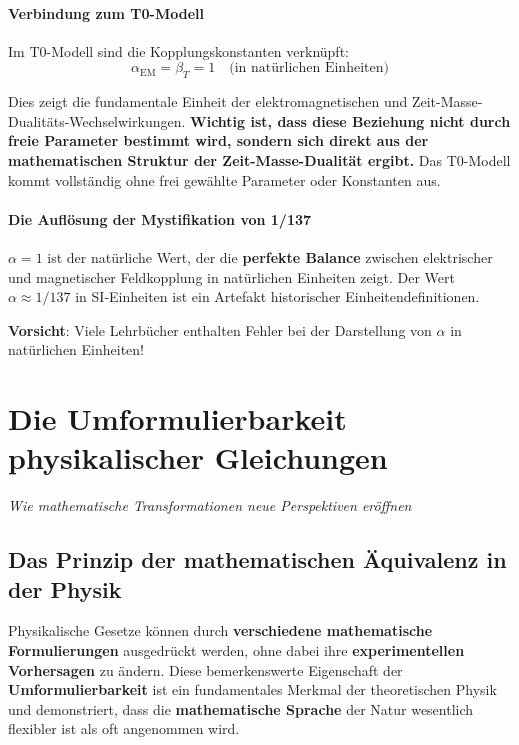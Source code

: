 \documentclass[12pt,a4paper]{report}
\begin{document}
	\subsubsection{Verbindung zum T0-Modell}
	
	Im T0-Modell sind die Kopplungskonstanten verknüpft:
	\begin{equation}
		\alpha_{\text{EM}} = \beta_T = 1 \quad \text{(in natürlichen Einheiten)}
	\end{equation}
	
	Dies zeigt die fundamentale Einheit der elektromagnetischen und Zeit-Masse-Dualitäts-Wechselwirkungen. \textbf{Wichtig ist, dass diese Beziehung nicht durch freie Parameter bestimmt wird, sondern sich direkt aus der mathematischen Struktur der Zeit-Masse-Dualität ergibt.} Das T0-Modell kommt vollständig ohne frei gewählte Parameter oder Konstanten aus.
	
	\subsubsection{Die Auflösung der Mystifikation von 1/137}
	
	$\alpha = 1$ ist der natürliche Wert, der die \textbf{perfekte Balance} zwischen elektrischer und magnetischer Feldkopplung in natürlichen Einheiten zeigt. Der Wert $\alpha \approx 1/137$ in SI-Einheiten ist ein Artefakt historischer Einheitendefinitionen.
	
	\textbf{Vorsicht}: Viele Lehrbücher enthalten Fehler bei der Darstellung von $\alpha$ in natürlichen Einheiten!
	\chapter{Die Umformulierbarkeit physikalischer Gleichungen}
	\textit{Wie mathematische Transformationen neue Perspektiven eröffnen}
	
	\section{Das Prinzip der mathematischen Äquivalenz in der Physik}
	
	Physikalische Gesetze können durch \textbf{verschiedene mathematische Formulierungen} ausgedrückt werden, ohne dabei ihre \textbf{experimentellen Vorhersagen} zu ändern. Diese bemerkenswerte Eigenschaft der \textbf{Umformulierbarkeit} ist ein fundamentales Merkmal der theoretischen Physik und demonstriert, dass die \textbf{mathematische Sprache} der Natur wesentlich flexibler ist als oft angenommen wird.
	
\end{document}
